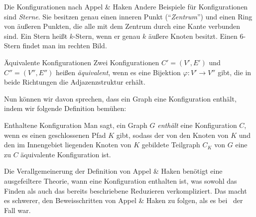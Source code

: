 \begin{section}{Die Konfigurationen nach Appel \& Haken}
  Andere Beispiele für Konfigurationen sind \textit{Sterne}. Sie besitzen genau einen inneren Punkt (``\textit{Zentrum}'') und einen Ring von äußeren Punkten, die alle mit dem Zentrum durch eine Kante verbunden sind. Ein Stern heißt $k$-Stern, wenn er genau $k$ äußere Knoten besitzt. Einen $6$-Stern findet man im rechten Bild.
  
  \begin{definition}{Äquivalente Konfigurationen}
   Zwei Konfigurationen $C'=(V',E')$ und $C''=(V'',E'')$ heißen \textit{äquivalent}, wenn es eine Bijektion $\varphi : V' \rightarrow V''$ gibt, die in beide Richtungen die Adjazenzstruktur erhält.
  \end{definition}
  
  Nun können wir davon sprechen, dass ein Graph eine Konfiguration enthält, indem wir folgende Definition bemühen:
  
  \begin{definition}{Enthaltene Konfiguration}
   Man sagt, ein Graph $G$ \textit{enthält} eine Konfiguration $C$, wenn es einen geschlossenen Pfad $K$ gibt, sodass der von den Knoten von $K$ und den im Innengebiet liegenden Knoten von $K$ gebildete Teilgraph $C_K$ von $G$ eine zu $C$ äquivalente Konfiguration ist.
  \end{definition}

  Die Verallgemeinerung der Definition von Appel \& Haken benötigt eine ausgefeiltere Theorie, wann eine Konfiguration enthalten ist, was sowohl das Finden als auch das bereits beschriebene Reduzieren verkompliziert. Das macht es schwerer, den Beweisschritten von Appel \& Haken zu folgen, als es bei \rsst\-\ der Fall war.
\end{section}
